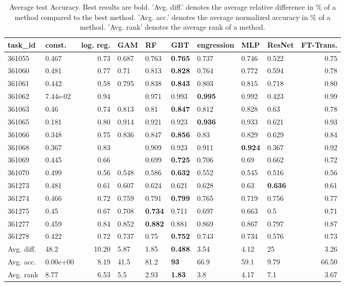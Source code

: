 \begin{table}[ht!]
\centering
\begingroup\footnotesize
\begin{tabular}{llrllllllr}
  \hline
\hline
task\_id & const. & log. reg. & GAM & RF & GBT & engression & MLP & ResNet & FT-Trans. \\ 
  \hline
361055 & 0.467 & 0.73 & 0.687 & 0.763 & \textbf{0.765} & 0.737 & 0.746 & 0.522 & 0.75 \\ 
  361060 & 0.481 & 0.77 & 0.71 & 0.813 & \textbf{0.828} & 0.764 & 0.772 & 0.594 & 0.78 \\ 
  361061 & 0.442 & 0.58 & 0.795 & 0.838 & \textbf{0.843} & 0.803 & 0.815 & 0.718 & 0.80 \\ 
  361062 & 7.44e-02 & 0.94 &  & 0.971 & 0.993 & \textbf{0.995} & 0.992 & 0.423 & 0.99 \\ 
  361063 & 0.46 & 0.74 & 0.813 & 0.81 & \textbf{0.847} & 0.812 & 0.828 & 0.63 & 0.78 \\ 
  361065 & 0.181 & 0.80 & 0.914 & 0.921 & 0.923 & \textbf{0.936} & 0.933 & 0.621 & 0.93 \\ 
  361066 & 0.348 & 0.75 & 0.836 & 0.847 & \textbf{0.856} & 0.83 & 0.829 & 0.629 & 0.84 \\ 
  361068 & 0.367 & 0.83 &  & 0.909 & 0.923 & 0.911 & \textbf{0.924} & 0.367 & 0.92 \\ 
  361069 & 0.445 & 0.66 &  & 0.699 & \textbf{0.725} & 0.706 & 0.69 & 0.662 & 0.72 \\ 
  361070 & 0.499 & 0.56 & 0.548 & 0.586 & \textbf{0.632} & 0.552 & 0.545 & 0.516 & 0.56 \\ 
  361273 & 0.481 & 0.61 & 0.607 & 0.624 & 0.621 & 0.628 & 0.63 & \textbf{0.636} & 0.61 \\ 
  361274 & 0.466 & 0.72 & 0.759 & 0.791 & \textbf{0.799} & 0.765 & 0.719 & 0.756 & 0.77 \\ 
  361275 & 0.45 & 0.67 & 0.708 & \textbf{0.734} & 0.711 & 0.697 & 0.663 & 0.5 & 0.71 \\ 
  361277 & 0.459 & 0.84 & 0.852 & \textbf{0.882} & 0.881 & 0.869 & 0.867 & 0.797 & 0.87 \\ 
  361278 & 0.422 & 0.72 & 0.737 & 0.75 & \textbf{0.752} & 0.743 & 0.734 & 0.576 & 0.73 \\ 
   \hline
Avg. diff. & 48.2 & 10.20 & 5.87 & 1.85 & \textbf{0.488} & 3.54 & 4.12 & 25 & 3.26 \\ 
  Avg. acc. & 0.00e+00 & 8.19 & 41.5 & 81.2 & \textbf{93} & 66.9 & 59.1 & 9.79 & 66.50 \\ 
  Avg. rank & 8.77 & 6.53 & 5.5 & 2.93 & \textbf{1.83} & 3.8 & 4.17 & 7.1 & 3.67 \\ 
   \hline
\hline
\end{tabular}
\endgroup
\caption{Average test Accuracy. 
                  Best results are bold. 
                  'Avg. diff.' denotes the average relative difference in \% of a method compared to the best method.
                  'Avg. acc.' denotes the average normalized accuracy in \% of a method.
                  'Avg. rank' denotes the average rank of a method.} 
\label{TABLES/table_results_Accuracy_spatial_depth}
\end{table}
